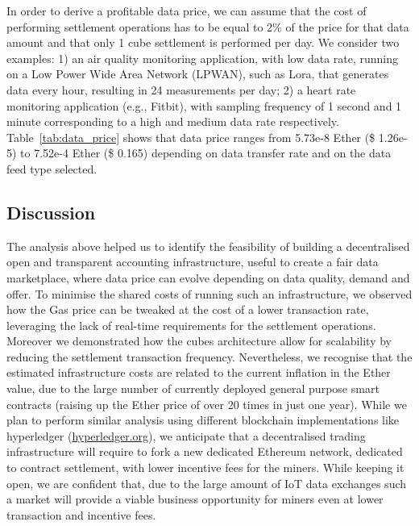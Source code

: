 \documentclass[chi_draft]{sigchi}
\begin{document}
{In order to derive a profitable data price, we can assume that the cost of performing settlement operations has to be equal to 2\% of the price for that data amount and that only 1 cube settlement is performed per day. We consider two examples: 1) an air quality monitoring application, with low data rate, running on a Low Power Wide Area Network (LPWAN), such as Lora, that generates data every hour, resulting in 24 measurements per day; 2) a heart rate monitoring application (e.g., Fitbit), with sampling frequency of 1 second and 1 minute corresponding to a high and medium data rate respectively.  
Table~\ref{tab:data_price} shows that data price ranges from 5.73e-8 Ether (\$ 1.26e-5) to 7.52e-4 Ether (\$ 0.165) depending on data transfer rate and on the data feed type selected. 

\subsection{Discussion}
\label{sec:discussion}
The analysis above helped us to identify the feasibility of building a decentralised open and transparent accounting infrastructure, useful to create a fair data marketplace, where data price can evolve depending on data quality, demand and offer. To minimise the shared costs of running such an infrastructure, we observed how the Gas price can be tweaked at the cost of a lower transaction rate, leveraging the lack of real-time requirements for the settlement operations. Moreover we demonstrated how the cubes architecture allow for scalability by reducing the settlement transaction frequency.
Nevertheless, we recognise that the estimated infrastructure costs are related to the current inflation in the Ether value, due to the large number of currently deployed general purpose smart contracts (raising up the Ether price of over 20 times in just one year). While we plan to perform similar analysis using different blockchain implementations like hyperledger (\url{hyperledger.org}), we anticipate that a decentralised trading infrastructure will require to fork a new dedicated Ethereum network, dedicated to contract settlement, with lower incentive fees for the miners. While keeping it open, we are confident that, due to the large amount of IoT data exchanges such a market will provide a viable business opportunity for miners even at lower transaction and incentive fees. 
}
\end{document}
